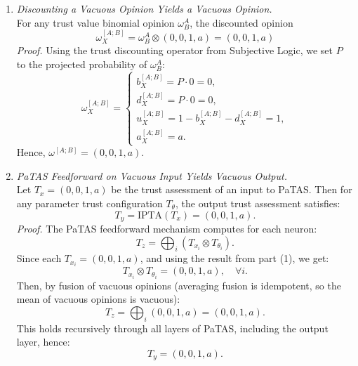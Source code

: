 \begin{enumerate}
    \item \emph{Discounting a Vacuous Opinion Yields a Vacuous Opinion.} \\
    For any trust value binomial opinion \(\omega^A_B \), the discounted opinion
    \[
    \omega^{[A;B]}_X = \omega^A_B \otimes (0,0,1,a)= (0,0,1,a)
    \]
    \textit{Proof.} Using the trust discounting operator from Subjective Logic, we set $P$ to the projected probability of \(\omega^A_B\):
    \[\omega^{[A;B]}_X =
    \begin{cases}
    b^{[A;B]}_X = P\cdot 0 = 0, \\
    d^{[A;B]}_X = P\cdot 0 = 0, \\
    u^{[A;B]}_X = 1 - b^{[A;B]}_X-d^{[A;B]}_X = 1, \\
    a^{[A;B]}_X = a.
    \end{cases}
    \]
    Hence, \( \omega^{[A;B]} = (0,0,1,a) \).

    \item \emph{PaTAS Feedforward on Vacuous Input Yields Vacuous Output.} \\
    Let \( T_x = (0,0,1,a)\) be the trust assessment of an input to PaTAS. Then for any parameter trust configuration \( T_\theta \), the output trust assessment satisfies:
    \[
    T_y = \text{IPTA}(T_x) = (0,0,1,a).
    \]
    \textit{Proof.} The PaTAS feedforward mechanism computes for each neuron:
    \[
    T_z = \bigoplus_i \left( T_{x_i} \otimes T_{\theta_i} \right).
    \]
    Since each \( T_{x_i} = (0,0,1,a) \), and using the result from part (1), we get:
    \[
    T_{x_i} \otimes T_{\theta_i} = (0,0,1,a), \quad \forall i.
    \]
    Then, by fusion of vacuous opinions (averaging fusion is idempotent, so the mean of vacuous opinions is vacuous):
    \[
    T_z = \bigoplus_i (0,0,1,a) = (0,0,1,a).
    \]
    This holds recursively through all layers of PaTAS, including the output layer, hence:
    \[
    T_y = (0,0,1,a).
    \]
\end{enumerate}


